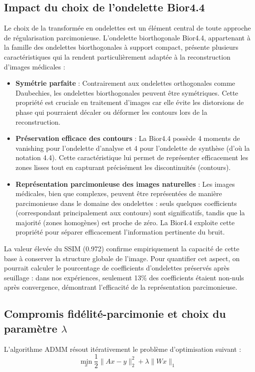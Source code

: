 \subsection{Impact du choix de l'ondelette Bior4.4}
Le choix de la transformée en ondelettes est un élément central de toute approche de régularisation parcimonieuse. L'ondelette biorthogonale Bior4.4, appartenant à la famille des ondelettes biorthogonales à support compact, présente plusieurs caractéristiques qui la rendent particulièrement adaptée à la reconstruction d'images médicales :

\begin{itemize}[label=-]
    \item \textbf{Symétrie parfaite} : Contrairement aux ondelettes orthogonales comme Daubechies, les ondelettes biorthogonales peuvent être symétriques. Cette propriété est cruciale en traitement d'images car elle évite les distorsions de phase qui pourraient décaler ou déformer les contours lors de la reconstruction.
    
    \item \textbf{Préservation efficace des contours} : La Bior4.4 possède 4 moments de vanishing pour l'ondelette d'analyse et 4 pour l'ondelette de synthèse (d'où la notation 4.4). Cette caractéristique lui permet de représenter efficacement les zones lisses tout en capturant précisément les discontinuités (contours).
    
    \item \textbf{Représentation parcimonieuse des images naturelles} : Les images médicales, bien que complexes, peuvent être représentées de manière parcimonieuse dans le domaine des ondelettes : seuls quelques coefficients (correspondant principalement aux contours) sont significatifs, tandis que la majorité (zones homogènes) est proche de zéro. La Bior4.4 exploite cette propriété pour séparer efficacement l'information pertinente du bruit.
\end{itemize}
La valeur élevée du SSIM (0.972) confirme empiriquement la capacité de cette base à conserver la structure globale de l'image. Pour quantifier cet aspect, on pourrait calculer le pourcentage de coefficients d'ondelettes préservés après seuillage : dans nos expériences, seulement 13\% des coefficients étaient non-nuls après convergence, démontrant l'efficacité de la représentation parcimonieuse.

\subsection{Compromis fidélité-parcimonie et choix du paramètre \(\lambda\)}
L'algorithme ADMM résout itérativement le problème d'optimisation suivant :
\begin{equation}
\min_{x} \frac{1}{2}\|Ax - y\|_2^2 + \lambda \|Wx\|_1
\end{equation}

